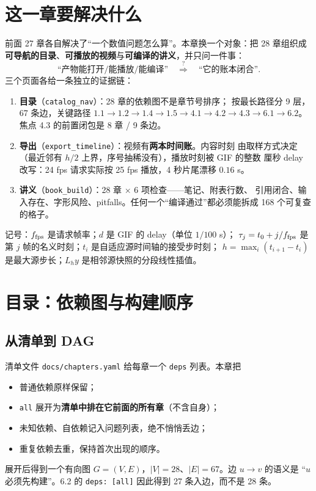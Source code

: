 

\section{这一章要解决什么}

前面 27 章各自解决了“一个数值问题怎么算”。本章换一个对象：把 28 章组织成
\textbf{可导航的目录}、\textbf{可播放的视频}与\textbf{可编译的讲义}，并只问一件事：
\[
  \text{“产物能打开/能播放/能编译”}
  \quad\stackrel{?}{\Longrightarrow}\quad
  \text{“它的账本闭合”}.
\]
三个页面各给一条独立的证据链：

\begin{enumerate}
  \item \textbf{目录}（\texttt{catalog\_nav}）：28 章的依赖图不是章节号排序；
        按最长路径分 9 层，67 条边，关键路径
        $1.1\to1.2\to1.4\to1.5\to4.1\to4.2\to4.3\to6.1\to6.2$。
        焦点 4.3 的前置闭包是 8 章 / 9 条边。
  \item \textbf{导出}（\texttt{export\_timeline}）：视频有\textbf{两本时间账}。内容时刻
        由取样方式决定（最近邻有 $h/2$ 上界，序号抽稀没有），播放时刻被 GIF 的整数
        厘秒 delay 改写：24 fps 请求实际按 25 fps 播放，4 秒片尾漂移 $0.16$ s。
  \item \textbf{讲义}（\texttt{book\_build}）：28 章 × 6 项检查——笔记、附表行数、
        引用闭合、输入存在、字形风险、pitfalls。任何一个“编译通过”都必须能拆成
        168 个可复查的格子。
\end{enumerate}

记号：$f_{\rm fps}$ 是请求帧率；$d$ 是 GIF 的 delay（单位 $1/100$ s）；
$\tau_j=t_0+j/f_{\rm fps}$ 是第 $j$ 帧的名义时刻；$t_i$ 是自适应源时间轴的接受步时刻；
$h=\max_i(t_{i+1}-t_i)$ 是最大源步长；$L_h y$ 是相邻源快照的分段线性插值。

\section{目录：依赖图与构建顺序}\label{sec:catalog}

\subsection{从清单到 DAG}

清单文件 \texttt{docs/chapters.yaml} 给每章一个 \texttt{deps} 列表。本章把
\begin{itemize}
  \item 普通依赖原样保留；
  \item \texttt{all} 展开为\textbf{清单中排在它前面的所有章}（不含自身）；
  \item 未知依赖、自依赖记入问题列表，绝不悄悄丢边；
  \item 重复依赖去重，保持首次出现的顺序。
\end{itemize}
展开后得到一个有向图 $G=(V,E)$，$|V|=28$、$|E|=67$。边 $u\to v$ 的语义是
“$u$ 必须先构建”。6.2 的 \texttt{deps: [all]} 因此得到 27 条入边，而不是 28 条。

